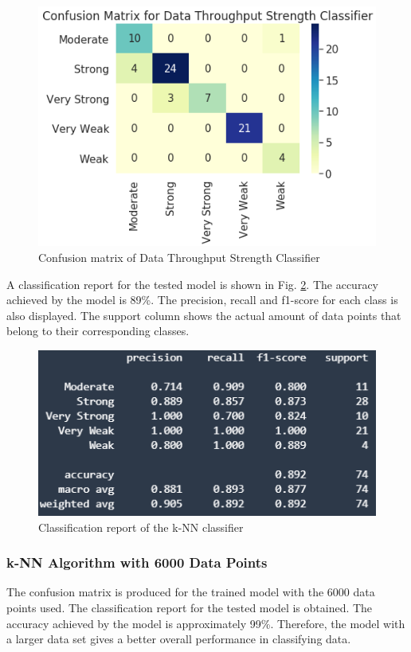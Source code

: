 \begin{figure} [ht]
    \centering
    \includegraphics[scale=1.0]{pages/Chapter 5/Chapter 5 images/knn_800.PNG}
    \caption{Confusion matrix of Data Throughput Strength Classifier}
    \label{fig_cm1}
\end{figure}

A classification report for the tested model is shown in Fig. \ref{fig_crknn}. The accuracy achieved by the model is 89\%. The precision, recall and f1-score for each class is also displayed. The support column shows the actual amount of data points that belong to their corresponding classes.   

\begin{figure} [ht]
    \centering
    \includegraphics[scale=1.3]{pages/Chapter 5/Chapter 5 images/C_report_knn.PNG}
    \caption{Classification report of the k-NN classifier}
    \label{fig_crknn}
\end{figure}


\subsubsection{k-NN Algorithm with 6000 Data Points}
The confusion matrix is produced for the trained model with the 6000 data points used. The classification report for the tested model is obtained. The accuracy achieved by the model is approximately 99\%. Therefore, the model with a larger data set gives a better overall performance in classifying data.

